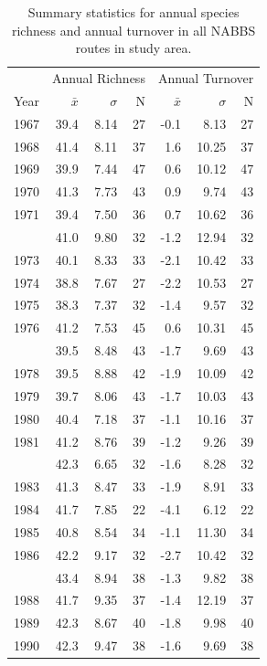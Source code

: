 \documentclass[12pt,twoside,openany]{reedthesis}
\begin{document}
\begin{longtable}{rrrrrrr}
\caption{\label{tab:richTurnTab}Summary statistics for annual species richness and annual turnover in all NABBS routes in study area.}\\
\toprule
\multicolumn{1}{c}{ } & \multicolumn{3}{c}{Annual Richness} & \multicolumn{3}{c}{Annual Turnover} \\
\cmidrule(l{3pt}r{3pt}){2-4} \cmidrule(l{3pt}r{3pt}){5-7}
Year & $\bar{x}$ & $\sigma$ & N & $\bar{x}$ & $\sigma$ & N\\
\midrule
1967 & 39.4 & 8.14 & 27 & -0.1 & 8.13 & 27\\
1968 & 41.4 & 8.11 & 37 & 1.6 & 10.25 & 37\\
1969 & 39.9 & 7.44 & 47 & 0.6 & 10.12 & 47\\
1970 & 41.3 & 7.73 & 43 & 0.9 & 9.74 & 43\\
1971 & 39.4 & 7.50 & 36 & 0.7 & 10.62 & 36\\
\addlinespace
1972 & 41.0 & 9.80 & 32 & -1.2 & 12.94 & 32\\
1973 & 40.1 & 8.33 & 33 & -2.1 & 10.42 & 33\\
1974 & 38.8 & 7.67 & 27 & -2.2 & 10.53 & 27\\
1975 & 38.3 & 7.37 & 32 & -1.4 & 9.57 & 32\\
1976 & 41.2 & 7.53 & 45 & 0.6 & 10.31 & 45\\
\addlinespace
1977 & 39.5 & 8.48 & 43 & -1.7 & 9.69 & 43\\
1978 & 39.5 & 8.88 & 42 & -1.9 & 10.09 & 42\\
1979 & 39.7 & 8.06 & 43 & -1.7 & 10.03 & 43\\
1980 & 40.4 & 7.18 & 37 & -1.1 & 10.16 & 37\\
1981 & 41.2 & 8.76 & 39 & -1.2 & 9.26 & 39\\
\addlinespace
1982 & 42.3 & 6.65 & 32 & -1.6 & 8.28 & 32\\
1983 & 41.3 & 8.47 & 33 & -1.9 & 8.91 & 33\\
1984 & 41.7 & 7.85 & 22 & -4.1 & 6.12 & 22\\
1985 & 40.8 & 8.54 & 34 & -1.1 & 11.30 & 34\\
1986 & 42.2 & 9.17 & 32 & -2.7 & 10.42 & 32\\
\addlinespace
1987 & 43.4 & 8.94 & 38 & -1.3 & 9.82 & 38\\
1988 & 41.7 & 9.35 & 37 & -1.4 & 12.19 & 37\\
1989 & 42.3 & 8.67 & 40 & -1.8 & 9.98 & 40\\
1990 & 42.3 & 9.47 & 38 & -1.6 & 9.69 & 38\\

\end{longtable}
\end{document}
